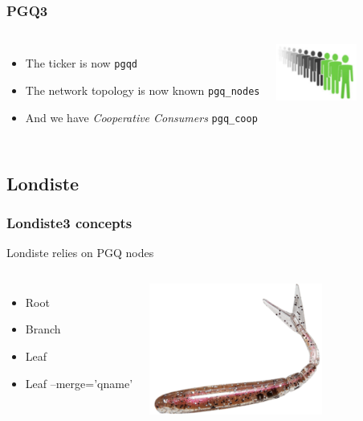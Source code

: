 \documentclass{beamer}
\begin{document}
\begin{frame}[fragile]
  \frametitle{PGQ3}

  \vfill

\begin{columns}[c]

  \begin{itemize}
    \item The ticker is now \texttt{pgqd}
    \item The network topology is now known \texttt{pgq\_nodes}
    \item And we have \textit{Cooperative Consumers} \texttt{pgq\_coop}
  \end{itemize}
\begin{center}
  \includegraphics[height=5em]{coop-workers.jpeg}
\end{center}
\end{columns}
\end{frame}

\subsection{Londiste}

\begin{frame}[fragile]
  \frametitle{Londiste3 concepts}

  Londiste relies on PGQ nodes
  \vfill

\begin{columns}[c]

  \begin{itemize}
    \item Root
    \item Branch
    \item Leaf
    \item Leaf --merge='qname'
  \end{itemize}

\begin{center}
  \includegraphics[height=1.7in]{drop-queue.png}
\end{center}
\end{columns}
\end{frame}
\end{document}
